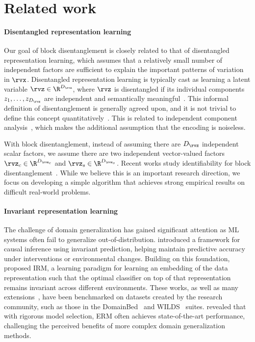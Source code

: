\section{Related work}
\paragraph{Disentangled representation learning}

Our goal of block disentanglement is closely related to that of disentangled representation learning, which assumes that a relatively small number of independent factors are sufficient to explain the important patterns of variation in $\rvx$. Disentangled representation learning is typically cast as learning a latent variable $\rvz \in \R^{D_\rvz}$, where $\rvz$ is disentangled if its individual components $z_1, \dotsc, z_{D_\rvz}$ are independent and semantically meaningful~\citep{higgins2017beta,esmaeili2019structured,kim2018disentangling,chen2018isolating}. This informal definition of disentanglement is generally agreed upon, and it is not trivial to define this concept quantitatively~\citep{eastwood2018framework,higgins2018towards}. This is related to independent component analysis~\citep{comon1994independent,jutten1991blind,hyvarinen2000independent}, which makes the additional assumption that the encoding is noiseless.

With block disentanglement, instead of assuming there are $D_\rvz$ independent scalar factors, we assume there are two independent vector-valued factors $\rvz_c \in \R^{D_{\rvz_c}}$ and $\rvz_s \in \R^{D_{\rvz_s}}$. Recent works study identifiability for block disentanglement~\citep{von2021self,lachapelle2022partial,kong2022partial,lachapelle2024additive,lopez2024toward}. While we believe this is an important research direction, we focus on developing a simple algorithm that achieves strong empirical results on difficult real-world problems.

\paragraph{Invariant representation learning}

The challenge of domain generalization has gained significant attention as ML systems often fail to generalize out-of-distribution. \citet{peters2016causal} introduced a framework for causal inference using invariant prediction, helping maintain predictive accuracy under interventions or environmental changes. Building on this foundation, \citet{arjovsky2019invariant} proposed IRM, a learning paradigm for learning an embedding of the data representation such that the optimal classifier on top of that representation remains invariant across different environments. These works, as well as many extensions~\citep{lu2021invariant}, have been benchmarked on datasets created by the research community, such as those in the DomainBed~\citep{gulrajani2020search} and WILDS~\citep{koh2021wilds} suites. \citet{gulrajani2020search} revealed that with rigorous model selection, ERM often achieves state-of-the-art performance, challenging the perceived benefits of more complex domain generalization methods.